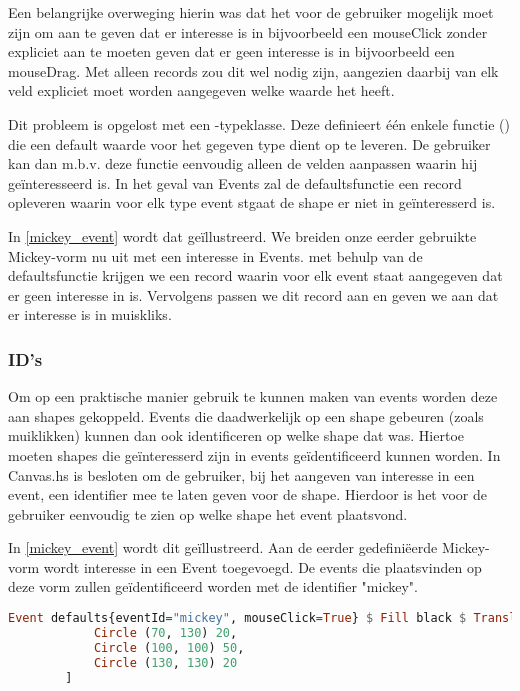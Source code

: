 Een belangrijke overweging hierin was dat het voor de gebruiker mogelijk moet zijn om aan te geven dat er interesse is in bijvoorbeeld een mouseClick zonder expliciet aan te moeten geven dat er geen interesse is in bijvoorbeeld een mouseDrag. Met alleen records zou dit wel nodig zijn, aangezien daarbij van elk veld expliciet moet worden aangegeven welke waarde het heeft.

Dit probleem is opgelost met een -typeklasse. Deze definieert één enkele functie () die een default waarde voor het gegeven type dient op te leveren. De gebruiker kan dan m.b.v. deze functie eenvoudig alleen de velden aanpassen waarin hij geïnteresseerd is. In het geval van Events zal de defaultsfunctie een record opleveren waarin voor elk type event stgaat de shape er niet in geïnteresserd is. 

In \autoref{mickey_event} wordt dat geïllustreerd. We breiden onze eerder gebruikte Mickey-vorm nu uit met een interesse in Events. met behulp van de defaultsfunctie krijgen we een record waarin voor elk event staat aangegeven dat er geen interesse in is. Vervolgens passen we dit record aan en geven we aan dat er interesse is in muiskliks.

\subsubsection{ID's}
Om op een praktische manier gebruik te kunnen maken van events worden deze aan shapes gekoppeld. Events die daadwerkelijk op een shape gebeuren (zoals muiklikken) kunnen dan ook identificeren op welke shape dat was. Hiertoe moeten shapes die geïnteresserd zijn in events geïdentificeerd kunnen worden. In Canvas.hs is besloten om de gebruiker, bij het aangeven van interesse in een event, een identifier mee te laten geven voor de shape. Hierdoor is het voor de gebruiker eenvoudig te zien op welke shape het event plaatsvond.

In \autoref{mickey_event} wordt dit geïllustreerd. Aan de eerder gedefiniëerde Mickey-vorm wordt interesse in een Event toegevoegd. De events die plaatsvinden op deze vorm zullen geïdentificeerd worden met de identifier "mickey".

\begin{lstlisting}[style=densecode, language=Haskell, caption=Mickey met interesse in een Event, label=mickey_event]
Event defaults{eventId="mickey", mouseClick=True} $ Fill black $ Translate 100 100 $ Rotate 90 $ Container 200 200 [
            Circle (70, 130) 20,
            Circle (100, 100) 50,
            Circle (130, 130) 20
        ]
\end{lstlisting}

